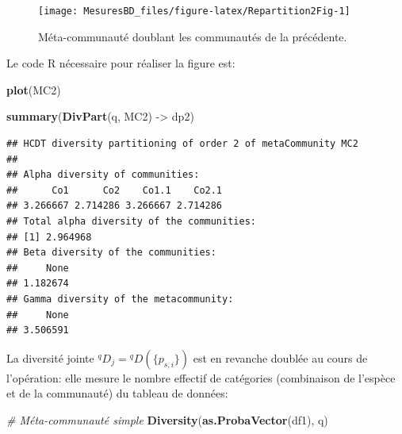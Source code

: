 \documentclass[
  11pt,
  french,
  a4paper,
  extrafontsizes,onecolumn,openright
  ]{memoir}
\newenvironment{Shaded}{\begin{snugshade}}{\end{snugshade}}
\newcommand{\CommentTok}[1]{\textcolor[rgb]{0.56,0.35,0.01}{\textit{#1}}}
\newcommand{\FunctionTok}[1]{\textcolor[rgb]{0.13,0.29,0.53}{\textbf{#1}}}
\newcommand{\NormalTok}[1]{#1}
\newcommand{\OtherTok}[1]{\textcolor[rgb]{0.56,0.35,0.01}{#1}}
\begin{document}
\normalsize

\scriptsize

\begin{figure}

{\centering \texttt{[image: MesuresBD\_files/figure-latex/Repartition2Fig-1]} 

}

\caption{Méta-communauté doublant les communautés de la précédente.}\label{fig:Repartition2Fig}
\end{figure}

\normalsize

Le code R nécessaire pour réaliser la figure est:

\scriptsize

\begin{Shaded}
\begin{Highlighting}[]
\FunctionTok{plot}\NormalTok{(MC2)}
\end{Highlighting}
\end{Shaded}

\normalsize

\scriptsize

\begin{Shaded}
\begin{Highlighting}[]
\FunctionTok{summary}\NormalTok{(}\FunctionTok{DivPart}\NormalTok{(q, MC2) }\OtherTok{{-}\textgreater{}}\NormalTok{ dp2)}
\end{Highlighting}
\end{Shaded}

\begin{verbatim}
## HCDT diversity partitioning of order 2 of metaCommunity MC2
## 
## Alpha diversity of communities: 
##      Co1      Co2    Co1.1    Co2.1 
## 3.266667 2.714286 3.266667 2.714286 
## Total alpha diversity of the communities: 
## [1] 2.964968
## Beta diversity of the communities: 
##     None 
## 1.182674 
## Gamma diversity of the metacommunity: 
##     None 
## 3.506591
\end{verbatim}

\normalsize

La diversité jointe \(^{q}\!D_{j}={^{q}\!D}(\{p_{s,i}\})\) est en revanche doublée au cours de l'opération: elle mesure le nombre effectif de catégories (combinaison de l'espèce et de la communauté) du tableau de données:

\scriptsize

\begin{Shaded}
\begin{Highlighting}[]
\CommentTok{\# Méta{-}communauté simple}
\FunctionTok{Diversity}\NormalTok{(}\FunctionTok{as.ProbaVector}\NormalTok{(df1), q)}
\end{Highlighting}
\end{Shaded}
\end{document}
